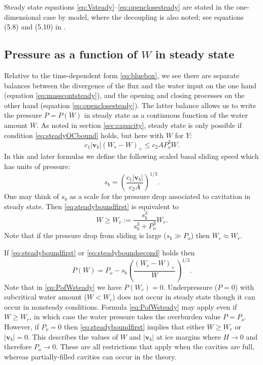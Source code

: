 \documentclass[gmd]{copernicus}   %
\newcommand\bv{\mathbf{v}}
\begin{document}
Steady state equations \eqref{eq:Vsteady}--\eqref{eq:openclosesteady} are stated in the one-dimensional case by \cite{Schoofetal2012} model, where the decoupling is also noted; see equations (5.8) and (5.10) in \citep{Schoofetal2012}.

\subsection{Pressure as a function of $W$ in steady state}  Relative to the time-dependent form \eqref{eq:bluebox}, we see there are separate balances between the divergence of the flux and the water input on the one hand (equation \eqref{eq:masscontsteady}), and the opening and closing processes on the other hand (equation \eqref{eq:openclosesteady}).  The latter balance allows us to write the pressure $P=P(W)$ in steady state as a continuous function of the water amount $W$.  As noted in section \ref{sec:capacity}, steady state is only possible if condition \eqref{eq:steadyOCbound} holds, but here with $W$ for $Y$:
\begin{equation}
c_1 |\bv_b| (W_r - W)_+ \le c_2 A P_o^3 W. \label{eq:steadyboundfirst}
\end{equation}
In this and later formulas we define the following scaled basal sliding speed which has units of pressure:
\begin{equation}
s_b =  \left(\frac{c_1 |\bv_b|}{c_2 A}\right)^{1/3}.  \label{eq:definesb}
\end{equation}
One may think of $s_b$ as a scale for the pressure drop associated to cavitation in steady state.  Then \eqref{eq:steadyboundfirst} is equivalent to
\begin{equation}
W \ge W_c := \frac{s_b^3}{s_b^3 + P_o^3} W_r. \label{eq:steadyboundsecond}
\end{equation}
Note that if the pressure drop from sliding is large ($s_b \gg P_o$) then $W_c\approx W_r$.

If \eqref{eq:steadyboundfirst} or \eqref{eq:steadyboundsecond} holds then
\begin{equation}
P(W) = P_o - s_b \left(\frac{(W_r - W)_+}{W}\right)^{1/3}.  \label{eq:PofWsteady}
\end{equation}
Note that in \eqref{eq:PofWsteady} we have $P(W_c)=0$.  Underpressure ($P=0$) with subcritical water amount ($W<W_c$) does not occur in steady state though it can occur in nonsteady conditions.  Formula \eqref{eq:PofWsteady} may apply even if $W\ge W_r$, in which case the water pressure takes the overburden value $P = P_o$.  However, if $P_o=0$ then \eqref{eq:steadyboundfirst} implies that either $W\ge W_r$ or $|\bv_b|=0$.  This describes the values of $W$ and $|\bv_b|$ at ice margins where $H\to 0$ and therefore $P_o\to 0$.  These are all restrictions that apply when the cavities are full, whereas partially-filled cavities can occur in the \cite{Schoofetal2012} theory.
\end{document}
